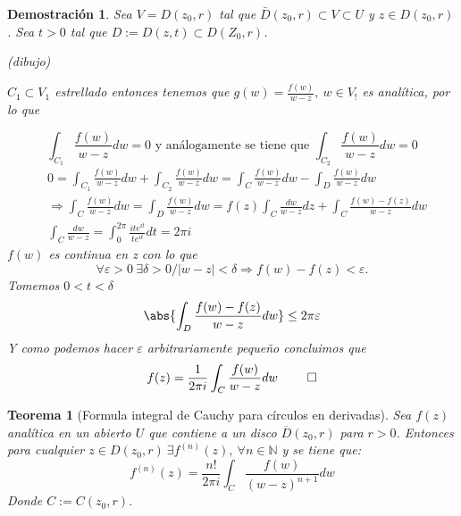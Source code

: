 \documentclass[10pt]{book}
\newtheorem{theorem}{Teorema}[chapter]
\newtheorem*{dem}{Demostración}
\newcommand{\N}{\mathbb{N}}
\begin{document}
\begin{dem}
Sea $V = D(z_0,r)$ tal que $\bar{D}(z_0,r)\subset V\subset U$ y $z\in D(z_0,r)$. Sea $t>0$ tal que $D:= D(z,t)\subset D(Z_0,r)$.

(dibujo)

$C_1 \subset V_1$ estrellado entonces tenemos que $g(w) = \frac{f(w)}{w-z},\ w\in V_!$ es analítica, por lo que

$$\int_{C_1} \frac{f(w)}{w-z} dw = 0 \text{ y análogamente se tiene que } \int_{C_2} \frac{f(w)}{w-z} dw = 0$$
\begin{align*}
&0 = \int_{C_1} \frac{f(w)}{w-z} dw + \int_{C_2} \frac{f(w)}{w-z} dw = \int_{C} \frac{f(w)}{w-z} dw - \int_{D} \frac{f(w)}{w-z} dw\\
&\Rightarrow \int_{C} \frac{f(w)}{w-z} dw = \int_{D} \frac{f(w)}{w-z} dw = f(z) \int_C\frac{dw}{w-z}dz + \int_C\frac{f(w)-f(z)}{w-z}dw\\
&\int_{C} \frac{dw}{w-z} = \int_0^{2\pi} \frac{ite^{it}}{te^{it}}dt = 2\pi i
\end{align*}
$f(w)$ es continua en z con lo que $$\forall \varepsilon>0 \ \exists \delta>0 / |w-z|<\delta \Rightarrow f(w)-f(z)<\varepsilon .$$ Tomemos $0<t<\delta$
$$\abs{\int_D\frac{f(w)-f(z)}{w-z}dw} \leq  2\pi \varepsilon$$
Y como podemos hacer $\varepsilon$ arbitrariamente pequeño concluimos que 
$$
f(z) = \frac{1}{2\pi i}\int_C \frac{f(w)}{w-z}dw\ \qed
$$
\end{dem}


\begin{theorem}[Formula integral de Cauchy para círculos en derivadas]
Sea $f(z)$ analítica en un abierto $U$ que contiene a un disco $\overline{D}(z_0,r)$ para $r>0$. Entonces para cualquier $z \in D(z_0,r)\ \exists f^{(n)}(z),\ \forall n\in \N$ y se tiene que:
$$
f^{(n)}(z) = \frac{n!}{2\pi i}\int_C \frac{f(w)}{(w-z)^{n+1}}dw
$$
Donde $C:= C(z_0,r)$.
\end{theorem}
\end{document}
